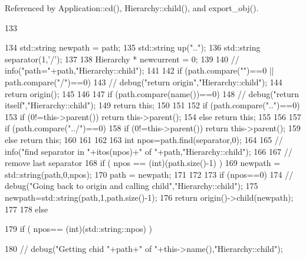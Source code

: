 Referenced by Application::cd(), Hierarchy::child(), and export\_\-obj().


\begin{DoxyCode}
133                                          {
134   std::string newpath = path;
135   std::string up("..");
136   std::string separator(1,'/');
137 
138   Hierarchy * newcurrent = 0;
139 
140   //  info("path="+path,"Hierarchy::child");
141 
142   if (path.compare("")==0 || path.compare("/")==0) {
143     //    debug("return origin","Hierarchy::child");
144     return origin();
145   }
146 
147   if (path.compare(name())==0){
148     //    debug("return itself","Hierarchy::child");
149     return this;
150   }
151 
152   if (path.compare("..")==0){
153     if (0!=this->parent()) return this->parent();
154     else return this;
155   }
156 
157   if (path.compare("../")==0){
158     if (0!=this->parent()) return this->parent();
159     else return this;
160   }
161 
162 
163   int npos=path.find(separator,0);
164 
165   //  info("find separator in "+itos(npos)+" of "+path,"Hierarchy::child");
166 
167   // remove last separator
168   if ( npos == (int)(path.size()-1) ) {
169     newpath = std::string(path,0,npos);
170     path = newpath;
171   }
172 
173   if (npos==0){
174     //    debug("Going back to origin and calling child","Hierarchy::child");
175     newpath=std::string(path,1,path.size()-1);
176     return origin()->child(newpath);
177   }
178   else{
179     if ( npos== (int)(std::string::npos) ){
180       //      debug("Getting chid "+path+" of "+this->name(),"Hierarchy::child");
      
}}}
\end{DoxyCode}
